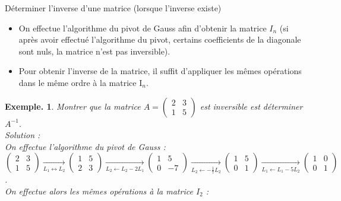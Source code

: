 \documentclass[12pt]{article}
\theoremstyle{break}
\newtheorem*{example}{Exemple.}
\begin{document}
\begin{method}{Déterminer l'inverse d'une matrice (lorsque l'inverse existe)}{}
\begin{itemize}[noitemsep,topsep=0pt]
  \item On effectue l'algorithme du pivot de Gauss afin d'obtenir la matrice $I_{n}$ (si après avoir effectué l'algorithme du pivot, certains coefficients de la diagonale sont nuls, la matrice n'est pas inversible).
  \item Pour obtenir l'inverse de la matrice, il suffit d'appliquer les mêmes opérations dans le même ordre à la matrice $\mathrm{I}_{n}$.
\end{itemize}
\end{method}

\begin{example}
Montrer que la matrice $A=\left(\begin{array}{ll}2 & 3 \\ 1 & 5\end{array}\right)$ est inversible est déterminer $A^{-1}$.\\
Solution :\\
On effectue l'algorithme du pivot de Gauss :\\
$\left(\begin{array}{ll}2 & 3 \\ 1 & 5\end{array}\right) \underset{L_{1} \leftrightarrow L_{2}}{\longrightarrow}\left(\begin{array}{ll}1 & 5 \\ 2 & 3\end{array}\right) \underset{L_{2} \leftarrow L_{2}-2 L_{1}}{\longrightarrow}\left(\begin{array}{cc}1 & 5 \\ 0 & -7\end{array}\right) \underset{L_{2} \leftarrow-\frac{1}{7} L_{2}}{\longrightarrow}\left(\begin{array}{ll}1 & 5 \\ 0 & 1\end{array}\right) \underset{L_{1} \leftarrow L_{1}-5 L_{2}}{\longrightarrow}\left(\begin{array}{ll}1 & 0 \\ 0 & 1\end{array}\right)$.\\
On effectue alors les mêmes opérations à la matrice $I_{2}$ :\\

\end{example}
\end{document}

